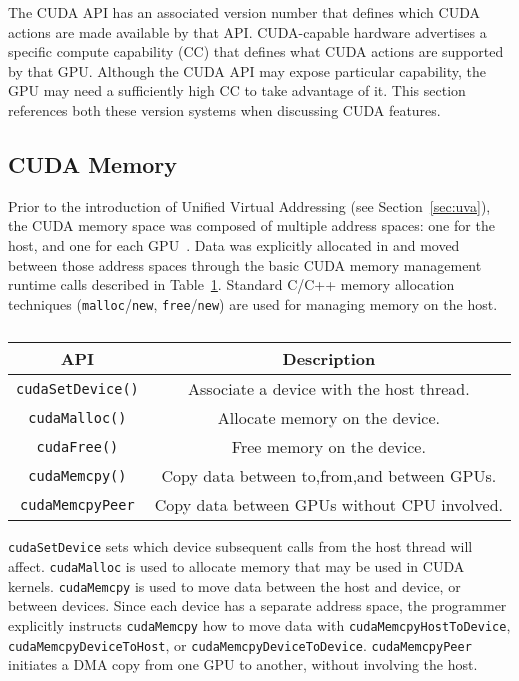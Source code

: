 The CUDA API has an associated version number that defines which CUDA actions are made available by that API.
CUDA-capable hardware advertises a specific compute capability (CC) that defines what CUDA actions are supported by that GPU.
Although the CUDA API may expose particular capability, the GPU may need a sufficiently high CC to take advantage of it.
This section references both these version systems when discussing CUDA features.

\subsection{CUDA Memory}

Prior to the introduction of Unified Virtual Addressing (see Section~\ref{sec:uva}), the CUDA memory space was composed of multiple address spaces: one for the host, and one for each GPU~\cite{schroeder2011peer}.
Data was explicitly allocated in and moved between those address spaces through the basic CUDA memory management runtime calls described in Table~\ref{tab:cuda-basic-apis}.
Standard C/C++ memory allocation techniques (\texttt{malloc}/\texttt{new}, \texttt{free}/\texttt{new}) are used for managing memory on the host.

\begin{table}[h]
	\centering
	\caption[Basic CUDA Memory-management APIs]{}
	\label{tab:cuda-basic-apis}
	\begin{tabular}{|c|c|}
		\hline
		\textbf{API}             & \textbf{Description}                        \\ \hline
		\texttt{cudaSetDevice()} & Associate a device with the host thread.    \\ \hline
		\texttt{cudaMalloc()}    & Allocate memory on the device.              \\ \hline
		\texttt{cudaFree()}      & Free memory on the device.                  \\ \hline
		\texttt{cudaMemcpy()}    & Copy data between to,from,and between GPUs. \\ \hline
		\texttt{cudaMemcpyPeer}  & Copy data between GPUs without CPU involved. \\ \hline 
	\end{tabular}
\end{table}

\texttt{cudaSetDevice} sets which device subsequent calls from the host thread will affect.
\texttt{cudaMalloc} is used to allocate memory that may be used in CUDA kernels.
\texttt{cudaMemcpy} is used to move data between the host and device, or between devices.
Since each device has a separate address space, the programmer explicitly instructs \texttt{cudaMemcpy} how to move data with \texttt{cudaMemcpyHostToDevice}, \texttt{cudaMemcpyDeviceToHost}, or \texttt{cudaMemcpyDeviceToDevice}.
\texttt{cudaMemcpyPeer} initiates a DMA copy from one GPU to another, without involving the host.

